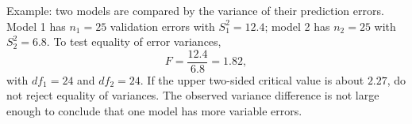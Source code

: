 \begin{solproblema}[prob:7d50e57]
Example: two models are compared by the variance of their prediction errors. Model 1 has $n_1=25$ validation errors with $S_1^2=12.4$; model 2 has $n_2=25$ with $S_2^2=6.8$. To test equality of error variances,
\[
	F=\frac{12.4}{6.8}=1.82,
\]
with $df_1=24$ and $df_2=24$. If the upper two-sided critical value is about $2.27$, do not reject equality of variances. The observed variance difference is not large enough to conclude that one model has more variable errors.
\end{solproblema}
